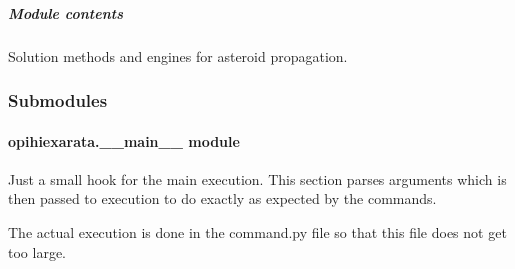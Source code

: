 \documentclass[letterpaper,11pt,english]{sphinxmanual}
\begin{document}
\subparagraph{Module contents}
\label{\detokenize{code/opihiexarata.propagate:module-opihiexarata.propagate}}\label{\detokenize{code/opihiexarata.propagate:module-contents}}
\sphinxAtStartPar
Solution methods and engines for asteroid propagation.


\subsubsection{Submodules}
\label{\detokenize{code/opihiexarata:submodules}}
\sphinxstepscope


\paragraph{opihiexarata.\_\_main\_\_ module}
\label{\detokenize{code/opihiexarata.__main__:module-opihiexarata.__main__}}\label{\detokenize{code/opihiexarata.__main__:opihiexarata-main-module}}\label{\detokenize{code/opihiexarata.__main__::doc}}
\sphinxAtStartPar
Just a small hook for the main execution. This section parses arguments
which is then passed to execution to do exactly as expected by the commands.

\sphinxAtStartPar
The actual execution is done in the command.py file so that this file
does not get too large.
\end{document}
